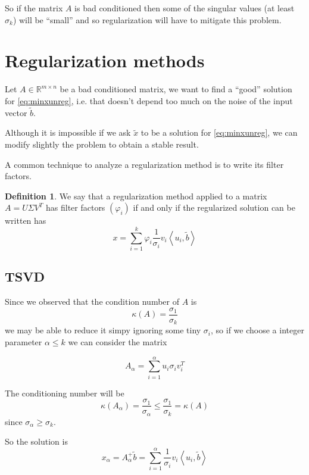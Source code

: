 \documentclass[a4paper,10pt]{article}
\newcounter{counter1}
\theoremstyle{plain}
\theoremstyle{definition}
\newtheorem{mydef}[counter1]{Definition}
\theoremstyle{remark}
\newcommand{\pa}[1]{\left(#1\right)}
\newcommand{\ang}[1]{\left<#1\right>}
\begin{document}
So if the matrix $A$ is bad conditioned then some of the singular
values (at least $\sigma _k$) will be ``small'' and so regularization
will have to mitigate this problem.

\section{Regularization methods}
\label{sec:regularizationmethods}

Let $A\in \mathbb{R}^{m \times n}$ be a bad conditioned matrix, we
want to find a ``good'' solution for \ref{eq:minxunreg}, i.e. that
doesn't depend too much on the noise of the input vector $\tilde b$.

Although it is impossible if we ask $\tilde x$ to be a solution for
\ref{eq:minxunreg}, we can modify slightly the problem to obtain a
stable result.

A common technique to analyze a regularization method is to write its
filter factors.

\begin{mydef}
  We say that a regularization method applied to a matrix $A = U
  \Sigma V^T$ has filter factors $\pa{\varphi _i}$ if and only if the
  regularized solution can be written has
  \begin{equation}
    \label{eq:filterdef}
    x = \sum _{i=1} ^k \varphi _i \frac{1}{\sigma _i} v_i
    \ang{u_i,\tilde b}
  \end{equation}
\end{mydef}

\subsection{TSVD}
\label{sec:TSVD}

Since we observed that the condition number of $A$ is
\[ \kappa (A) = \frac{\sigma _1}{\sigma _k} \] we may be able to
reduce it simpy ignoring some tiny $\sigma _i$, so if we choose a
integer parameter $\alpha \le k$ we can consider the matrix

\begin{equation}
  \label{eq:TSVDmatrix}
  A_\alpha = \sum _{i=1} ^\alpha u_i \sigma _i v_i ^T
\end{equation}

The conditioning number will be
\[ \kappa (A_\alpha) = \frac{\sigma _1}{\sigma _\alpha} \le  \frac{\sigma
  _1}{\sigma _k} = \kappa(A) \]
since $\sigma _\alpha \ge \sigma _k$.

So the solution is
\begin{equation}
  \label{eq:TSVDsolution}
  x_\alpha = A_\alpha ^+ \tilde b = \sum _{i=1} ^\alpha \frac{1}{\sigma _i}
  v_i \ang{u_i,\tilde b}
\end{equation}
\end{document}
